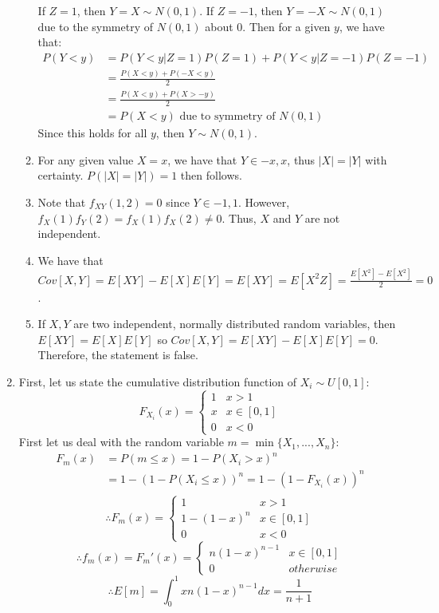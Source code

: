 \documentclass[letterpaper,12pt]{article}
\theoremstyle{definition}
\begin{document}
\begin{enumerate}
\begin{enumerate}
      If $Z=1$, then $Y = X \sim N(0,1)$. If $Z=-1$, then $Y = -X \sim N(0,1)$ due to the symmetry of $N(0,1)$ about 0. Then for a given $y$, we have that:
        \begin{align*}
          P(Y < y) &= P(Y < y | Z = 1)P(Z=1) + P(Y < y | Z = -1)P(Z=-1)\\
          &= \frac{P(X < y) + P(-X < y)}{2} \\
          &= \frac{P(X < y) + P(X > -y)}{2} \\
          &= P(X < y) \text{ due to symmetry of } N(0,1)
        \end{align*}
        Since this holds for all $y$, then $Y \sim N(0,1)$.
      \item
      For any given value $X=x$, we have that $Y \in {-x, x}$, thus $|X| = |Y|$ with certainty. $P(|X|=|Y|)=1$ then follows.
      \item
      Note that $f_{XY}(1, 2) = 0$ since $Y \in {-1,1}$. However, $f_X(1)f_Y(2) = f_X(1)f_X(2) \neq 0$. Thus, $X$ and $Y$ are not independent.
      \item
      We have that $Cov[X,Y] = E[XY] - E[X]E[Y] = E[XY] = E[X^2Z] = \frac{E[X^2] - E[X^2]}{2} = 0$.
      \item
      If $X,Y$ are two independent, normally distributed random variables, then $E[XY] = E[X]E[Y]$ so $Cov[X,Y] = E[XY] - E[X]E[Y] = 0$. Therefore, the statement is false.
    \end{enumerate}
  \item
    First, let us state the cumulative distribution function of $X_i \sim U[0,1]$:
      \[
        F_{X_i}(x) =
        \begin{cases}
          1 & x > 1 \\
          x & x \in [0,1] \\
          0 & x < 0
        \end{cases}
      \]
    First let us deal with the random variable $m = \min{\{X_1,...,X_n\}}$:
      \begin{align*}
        F_m(x) &= P(m \leq x) = 1 - P(X_i > x)^n \\
        &= 1 - (1-P(X_i \leq x))^n = 1 - (1 - F_{X_i}(x))^n \\
      \end{align*}
        \[
          \therefore F_m(x) =
          \begin{cases}
            1 & x > 1 \\
            1-(1-x)^n & x \in [0,1] \\
            0 & x < 0
          \end{cases}
        \]
        \[
          \therefore f_m(x) = F_m'(x) =
          \begin{cases}
            n(1-x)^{n-1} & x \in [0,1] \\
            0 & otherwise
          \end{cases}
        \]
      \begin{equation*}
        \therefore E[m] = \int_0^1 xn(1-x)^{n-1}dx = \frac{1}{n+1}
      \end{equation*}


\end{enumerate}
\end{document}
